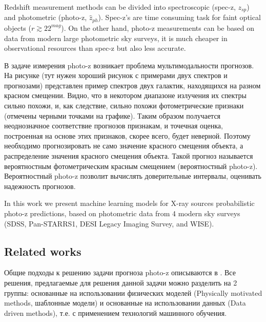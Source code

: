 \documentclass[fleqn,usenatbib]{mnras}
\begin{document}
Redshift measurement methods \citep{2019NatAs...3..212S} can be divided into spectroscopic (spec-z, $z_{sp}$) and photometric (photo-z, $\hat{z}_{ph}$). Spec-z's are time consuming task for faint optical objects ($r\gtrsim22^{mag}$). On the other hand, photo-z measurements can be based on data from modern large photometric sky surveys, it is much cheaper in observational resources than spec-z but also less accurate. 

В задаче измерения photo-z возникает проблема мультимодальности прогнозов. На рисунке (тут нужен хороший рисунок с примерами двух спектров и прогнозами) представлен пример спектров двух галактик, находящихся на разном красном смещении. Видно, что в некотором диапазоне излучения их спектры сильно похожи, и, как следствие, сильно похожи фотометрические признаки (отмечены черными точками на графике). Таким образом получается неоднозначное соответствие прогнозов признакам, и точечная оценка, построенная на основе этих признаков, скорее всего, будет неверной. Поэтому необходимо прогнозировать не само значение красного смещения объекта, а распределение значения красного смещения объекта. Такой прогноз называется вероятностным фотометрическим красным смещением (вероятностный photo-z). Вероятностный photo-z позволит вычислять доверительные интервалы, оценивать надежность прогнозов.

In this work we present machine learning models for X-ray sources probabilistic photo-z predictions, based on photometric data from 4 modern sky surveys (SDSS, Pan-STARRS1, DESI Legacy Imaging Survey, and WISE).

\subsection{Related works}
Общие подходы к решению задачи прогноза photo-z описываются в \cite{bib:nature_photoz}. Все решения, предлагаемые для решения данной задачи можно разделить на 2 группы: основанные на использовании физических моделей (Physically motivated methods, шаблонные модели) и основанные на использовании данных (Data driven methods), т.е. с применением технологий машинного обучения.
\end{document}
